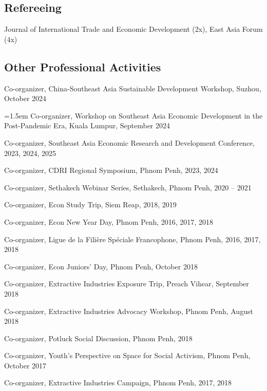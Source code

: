 \documentclass[10pt,a4paper]{article}
\begin{document}
\subsection*{Refereeing}

Journal of International Trade and Economic Development (2x), East Asia Forum (4x)


\subsection*{Other Professional Activities}

Co-organizer, China-Southeast Asia Sustainable Development Workshop, Suzhou, October 2024

\hangindent=1.5em
Co-organizer, Workshop on Southeast Asia Economic Development in the Post-Pandemic Era, Kuala Lumpur, September 2024

Co-organizer, Southeast Asia Economic Research and Development Conference, 2023, 2024, 2025

Co-organizer, CDRI Regional Symposium, Phnom Penh, 2023, 2024

Co-organizer, Sethakech Webinar Series, Sethakech, Phnom Penh, 2020 -- 2021

Co-organizer, Econ Study Trip, Siem Reap, 2018, 2019

Co-organizer, Econ New Year Day, Phnom Penh, 2016, 2017, 2018

Co-organizer, Ligue de la Filière Spéciale Francophone, Phnom Penh, 2016, 2017, 2018

Co-organizer, Econ Juniors' Day, Phnom Penh, October 2018

Co-organizer, Extractive Industries Exposure Trip, Preach Vihear, September 2018

Co-organizer, Extractive Industries Advocacy Workshop, Phnom Penh, August 2018

Co-organizer, Potluck Social Discussion, Phnom Penh, 2018

Co-organizer, Youth's Perspective on Space for Social Activism, Phnom Penh, October 2017

Co-organizer, Extractive Industries Campaign, Phnom Penh, 2017, 2018
\end{document}
